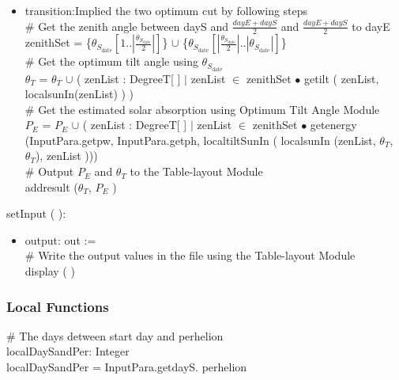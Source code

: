 \documentclass[12pt, titlepage]{article}
\begin{document}
\begin{itemize}
\item transition:Implied the two optimum cut by following steps\\

$\#$ Get the zenith angle between dayS and
$\frac{dayE + dayS}{2}$ and $\frac{dayE + dayS}{2}$ to dayE\\
zenithSet =  \{$\theta_{S_{\text{date}}}[1.. | \frac{\theta_{S_{\text{date}}}}{2}|]$\} $\cup$ \{$\theta_{S_{\text{date}}}[| \frac{\theta_{S_{\text{date}}}}{2}|.. | \theta_{S_{\text{date}}}|]$\}\\
 
$\#$ Get the optimum tilt angle using $\theta_{S_{\text{date}}}$\\
$\theta_{T}$ = $\theta_{T}$ $\cup$ ( zenList : DegreeT[ ] $|$ zenList $\in$ zenithSet $\bullet$ getilt ( zenList, localsunIn(zenList) ) )\\

$\#$ Get the estimated solar absorption using Optimum Tilt Angle Module\\

$P_{E}$ = $P_{E}$ $\cup$  ( zenList : DegreeT[ ] $|$ zenList $\in$ zenithSet $\bullet$ getenergy (InputPara.getpw, InputPara.getph, localtiltSunIn ( localsunIn (zenList, $\theta_{T}$, $\theta_{T}$), zenList )))\\

$\#$ Output $P_{E}$ and $\theta_{T}$ to the Table-layout Module\\
addresult ($\theta_{T}$, $P_{E}$ )\\

\end{itemize}

\noindent  setInput ( ):
\begin{itemize}
\item output: out :=\\
$\#$ Write the output values in the file using the Table-layout Module\\
display ( )
\end{itemize}
\subsubsection{Local Functions}

$\#$ The days detween start day and perhelion\\
localDaySandPer: Integer\\
localDaySandPer = InputPara.getdayS. perhelion\\
\end{document}
